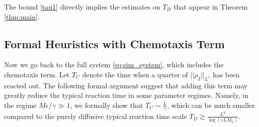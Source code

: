 \documentclass[12pt,reqno]{amsart}
\begin{document}
The bound \eqref{tau1} directly implies the estimates on $T_D$ that appear in Theorem \ref{thm:main}.

\begin{comment}
which, after a change of variable $y=\frac{2\sqrt{t}}{L}$, is equivalent to
\begin{imaths} 
\frac {L}{2}\int ^{{2\sqrt {\tau }}/{L}}_{- {2\sqrt {\tau }}/{L}}e^{-\frac {1}{y^{2}}}dy\gtrsim \frac {1}{M\varepsilon }.
\end{imaths}
Direct integration of \eqref{eq:change_of_var} gives
\begin{imaths} 
\frac{L}{2} \left(e^{-\frac{L^2}{4\tau}}+2\sqrt{\pi}(\text{erf}(\frac{2\sqrt{\tau}}{L})-1)\right)= \frac {L}{2}\int ^{{2\sqrt {\tau }}/{L}}_{- {2\sqrt {\tau }}/{L}}e^{-\frac {1}{y^{2}}}dy\gtrsim \frac {1}{M\varepsilon }.
\end{imaths}
where $\text{erf}$ is defined as $\frac{2}{\sqrt{\pi}}\int _0^ z e^{-(x^2)}dx$
To estimate $\tau$, we consider the following two cases.\\
\textbf{Case 1.} $M\epsilon\ll 1$, which corresponds to very weak reaction regime, or fairly small $M$ regime.\\
\textbf{Case 2.} $M\epsilon\gg 1$, more relevant reaction regime. Note that in this case we have $\frac{\sqrt{\tau}}{L}<1$, then $\text{erf}(\frac{2\sqrt{\tau}}{L})$ is close to 1. One can use \eqref{eq:Upper_bound_half_time} and solve for $\tau$:
\begin{imaths} 
\tau \geq \frac {L^2}{\log(M\varepsilon L)}
\end{imaths}
\end{comment}

\subsection{Formal Heuristics with Chemotaxis Term}

Now we go back to the full system \eqref{eq:sim_system}, which includes the chemotaxis term. Let $T_C$ denote the time when a quarter of $||\rho_2||_{L^1}$ has been reacted out. The following formal argument suggest that adding this term may greatly 
reduce the typical reaction time in some parameter regimes.
Namely, in the regime $M\epsilon/\gamma\gg 1$, we formally show that $T_C\sim\frac{L}{\gamma}$, which can be much smaller compared to the purely diffusive typical reaction time scale $T_D\gtrsim \frac {L^2}{\log(\varepsilon LM_0)}$.
\end{document}
